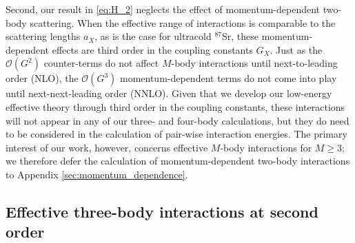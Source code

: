\documentclass[preprint,showkeys,nofootinbib]{revtex4-1}
\newcommand{\p}[1]{\left(#1\right)} %
\renewcommand{\O}{\mathcal{O}}
\newcommand{\1}{\mathds{1}}
\begin{document}
Second, our result in \eqref{eq:H_2} neglects the effect of
momentum-dependent two-body scattering.  When the effective range of
interactions is comparable to the scattering lengths $a_X$, as is the
case for ultracold ${}^{87}$Sr, these momentum-dependent effects are
third order in the coupling constants $G_X$.  Just as the $\O\p{G^2}$
counter-terms do not affect $M$-body interactions until
next-to-leading order (NLO), the $\O\p{G^3}$ momentum-dependent terms
do not come into play until next-next-leading order (NNLO).  Given
that we develop our low-energy effective theory through third order in
the coupling constants, these interactions will not appear in any of
our three- and four-body calculations, but they do need to be
considered in the calculation of pair-wise interaction energies.  The
primary interest of our work, however, concerns effective $M$-body
interactions for $M\ge3$; we therefore defer the calculation of
momentum-dependent two-body interactions to Appendix
\ref{sec:momentum_dependence}.


\subsection{Effective three-body interactions at second order}
\end{document}
